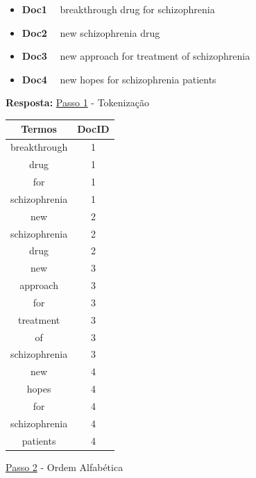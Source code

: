 \documentclass[12pt,a4paper,oneside]{article}
\begin{document}
\begin{enumerate}
		\begin{itemize}
			\item[] {\bf Doc1} \ \ breakthrough drug for schizophrenia
			\item[] {\bf Doc2} \ \ new schizophrenia drug
			\item[] {\bf Doc3} \ \ new approach for treatment of schizophrenia
			\item[] {\bf Doc4} \ \ new hopes for schizophrenia patients
		\end{itemize}
	
	{\color{blue} 
		{\bf Resposta:} \underline{Passo 1} - Tokenização\\
		\begin{center}
			\begin{tabular}{cc}
				\hline
				Termos			&	DocID	\\
				\hline	
				breakthrough	&	1		\\
				drug			&	1		\\
				for				&	1		\\
				schizophrenia	&	1		\\
				new				&	2		\\
				schizophrenia	&	2		\\
				drug			&	2		\\
				new				&	3		\\ 
				approach		&	3		\\ 
				for 			&	3		\\
				treatment 		&	3		\\
				of 				&	3		\\
				schizophrenia	&	3		\\
				new 			&	4		\\
				hopes 			&	4		\\
				for 			&	4		\\
				schizophrenia 	&	4		\\
				patients		&	4		\\
				\hline			
			\end{tabular}
		\end{center}
	
	\newpage
	\underline{Passo 2} - Ordem Alfabética\\
	
}
\end{enumerate}
\end{document}
